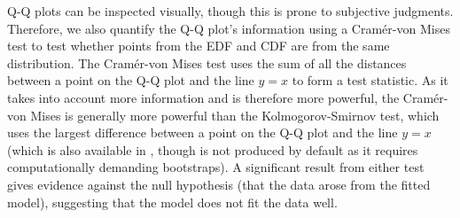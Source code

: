 \documentclass[article]{jss}\usepackage[]{graphicx}\usepackage[]{color}
\begin{document}
Q-Q plots can be inspected visually, though this is prone to subjective judgments. Therefore, we also quantify the Q-Q plot's information using a Cram\'{e}r-von Mises test \citep{Burnham:2004vd} to test whether points from the EDF and CDF are from the same distribution. The Cram\'{e}r-von Mises test uses the sum of all the distances between a point on the Q-Q plot and the line $y=x$ to form a test statistic. As it takes into account more information and is therefore more powerful, the Cram\'{e}r-von Mises is generally more powerful than the Kolmogorov-Smirnov test, which uses the largest difference between a point on the Q-Q plot and the line $y=x$ (which is also available in , though is not produced by default as it requires computationally demanding bootstraps). A significant result from either test gives evidence against the null hypothesis (that the data arose from the fitted model), suggesting that the model does not fit the data well.
\end{document}

